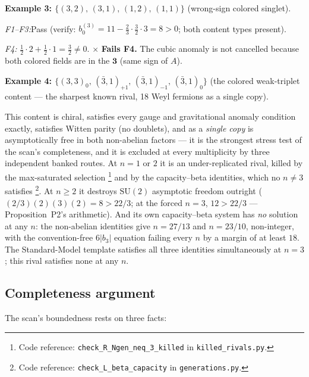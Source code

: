 \documentclass[11pt]{article}
\theoremstyle{definition}
\newcommand{\SU}{\mathrm{SU}}
\newcommand{\coderef}[2]{\footnote{Code reference: \texttt{#1} in \texttt{#2}.}}
\begin{document}
\bigskip
\noindent\textbf{Example 3: $\{(3,2),\, (3,1),\, (1,2),\, (1,1)\}$}
(wrong-sign colored singlet).

\smallskip\noindent\textit{F1--F3:}\quad Pass (verify: $b_0^{(3)} = 11
- \tfrac{2}{3}\!\cdot\!\tfrac{3}{2}\!\cdot\!3 = 8 > 0$; both content
types present).

\smallskip\noindent\textit{F4:}\quad
$\tfrac{1}{2}\!\cdot\!2 + \tfrac{1}{2}\!\cdot\!1 = \tfrac{3}{2}
\ne 0$.  $\boldsymbol{\times}$ \textbf{Fails F4.}  The cubic anomaly is not
cancelled because both colored fields are in the $\mathbf{3}$ (same
sign of $A$).

\bigskip
\noindent\textbf{Example 4: $\{(3,3)_{0},\, (\bar{3},1)_{+1},\,
(\bar{3},1)_{-1},\, (\bar{3},1)_{0}\}$} (the colored weak-triplet content
--- the sharpest known rival, 18 Weyl fermions as a single copy).

\smallskip\noindent This content is chiral, satisfies every gauge and
gravitational anomaly condition exactly, satisfies Witten parity (no
doublets), and as a \emph{single copy} is asymptotically free in both
non-abelian factors --- it is the strongest stress test of the scan's
completeness, and it is excluded at every multiplicity by three independent
banked routes.  At $n = 1$ or $2$ it is an under-replicated rival, killed by
the max-saturated selection \coderef{check\_R\_Ngen\_neq\_3\_killed}{killed\_rivals.py}
and by the capacity--beta identities, which no $n \ne 3$ satisfies
\coderef{check\_L\_beta\_capacity}{generations.py}.  At $n \ge 2$ it
destroys $\SU(2)$ asymptotic freedom outright ($(2/3)(2)(3)(2) = 8 > 22/3$;
at the forced $n = 3$, $12 > 22/3$ --- Proposition~P2's arithmetic).  And its
own capacity--beta system has \emph{no} solution at any $n$: the non-abelian
identities give $n = 27/13$ and $n = 23/10$, non-integer, with the
convention-free $6|b_3|$ equation failing every $n$ by a margin of at least
$18$.  The Standard-Model template satisfies all three identities
simultaneously at $n = 3$; this rival satisfies none at any $n$.

\subsection{Completeness argument}
\label{app:completeness}

The scan's boundedness rests on three facts:
\end{document}

